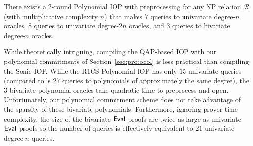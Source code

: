 \begin{theorem}
There exists a $2$-round Polynomial IOP with preprocessing for any NP relation $\mathcal{R}$ (with multiplicative complexity $n$) that makes $7$ queries to univariate degree-$n$ oracles, $8$ queries to univariate degree-$2n$ oracles, and $3$ queries to bivariate degree-$n$ oracles.  
\end{theorem}
 
While theoretically intriguing, compiling the QAP-based IOP with our polynomial commitments of Section~\ref{sec:protocol} is less practical than compiling the \textsf{Sonic} IOP. While the R1CS Polynomial IOP has only $15$ univariate queries (compared to 's $27$ queries to polynomials of approximately the same degree), the $3$ bivariate polynomial oracles take quadratic time to preprocess and open. Unfortunately, our polynomial commitment scheme does not take advantage of the sparsity of these bivariate polynomials. Furthermore, ignoring prover time complexity, the size of the bivariate $\textsf{{Eval}}$ proofs are twice as large as univariate $\textsf{{Eval}}$ proofs so the number of queries is effectively equivalent to $21$ univariate degree-$n$ queries. 